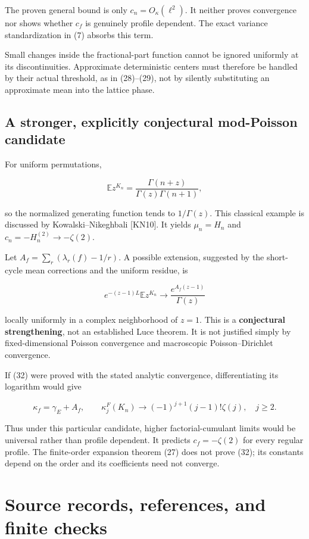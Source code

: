 \documentclass[
  11pt,
]{article}
\begin{document}
The proven general bound is only \(c_n=O_\kappa(\ell^2)\). It neither
proves convergence nor shows whether \(c_f\) is genuinely profile
dependent. The exact variance standardization in (7) absorbs this term.

Small changes inside the fractional-part function cannot be ignored
uniformly at its discontinuities. Approximate deterministic centers must
therefore be handled by their actual threshold, as in (28)--(29), not by
silently substituting an approximate mean into the lattice phase.

\subsection{A stronger, explicitly conjectural mod-Poisson
candidate}\label{a-stronger-explicitly-conjectural-mod-poisson-candidate}

For uniform permutations,

\[
\mathbb E z^{K_n}=\frac{\Gamma(n+z)}{\Gamma(z)\Gamma(n+1)},
\]

so the normalized generating function tends to \(1/\Gamma(z)\). This
classical example is discussed by Kowalski--Nikeghbali {[}KN10{]}. It
yields \(\mu_n=H_n\) and \(c_n=-H_n^{(2)}\to-\zeta(2)\).

Let \(A_f=\sum_r(\lambda_r(f)-1/r)\). A possible extension, suggested by
the short-cycle mean corrections and the uniform residue, is

\[
e^{-(z-1)L}\mathbb E z^{K_n}
\longrightarrow \frac{e^{A_f(z-1)}}{\Gamma(z)}
\tag{32}
\]

locally uniformly in a complex neighborhood of \(z=1\). This is a
\textbf{conjectural strengthening}, not an established Luce theorem. It
is not justified simply by fixed-dimensional Poisson convergence and
macroscopic Poisson--Dirichlet convergence.

If (32) were proved with the stated analytic convergence,
differentiating its logarithm would give

\[
\kappa_f=\gamma_E+A_f,
\qquad
\kappa_j^F(K_n)\longrightarrow
(-1)^{j+1}(j-1)!\zeta(j),\quad j\ge2.
\tag{33}
\]

Thus under this particular candidate, higher factorial-cumulant limits
would be universal rather than profile dependent. It predicts
\(c_f=-\zeta(2)\) for every regular profile. The finite-order expansion
theorem (27) does not prove (32); its constants depend on the order and
its coefficients need not converge.

\section{Source records, references, and finite
checks}\label{source-records-references-and-finite-checks}
\end{document}
